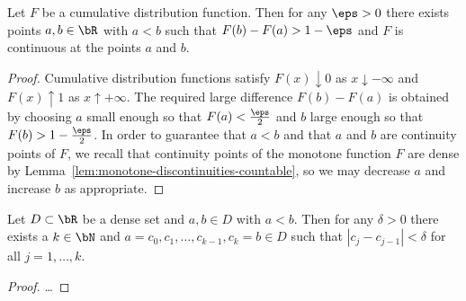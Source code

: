 \begin{lemma}
  \label{lem:cdf-tight}
  \leanok
  Let $F$ be a cumulative distribution function. Then for any
  $\eps > 0$ there exists points $a,b \in \bR$ with $a < b$ such that
  $F(b) - F(a) > 1 - \eps$ and $F$ is continuous at the points $a$ and $b$.
\end{lemma}
\begin{proof}
  Cumulative distribution functions satisfy
  $F(x) \downarrow 0$ as $x \downarrow - \infty$ and
  $F(x) \uparrow 1$ as $x \uparrow + \infty$. The
  required large difference $F(b) - F(a)$ is
  obtained by choosing $a$ small enough so that $F(a) < \frac{\eps}{2}$
  and $b$ large enough so that $F(b) > 1 - \frac{\eps}{2}$.
  In order to guarantee that $a < b$ and
  that $a$ and $b$ are continuity points of $F$, we
  recall that continuity points of the monotone function $F$ are dense
  by Lemma~\ref{lem:monotone-discontinuities-countable}, so we
  may decrease $a$ and increase $b$ as appropriate.
\end{proof}

\begin{lemma}
  \label{lem:subdivision-dense}
  \leanok
  Let $D \subset \bR$ be a dense set and $a,b \in D$ with $a < b$.
  Then for any $\delta > 0$ there exists a $k \in \bN$
  and $a = c_0, c_1, \ldots, c_{k-1}, c_k = b \in D$ such that
  $|c_j - c_{j-1}| < \delta$ for all $j=1,\ldots,k$.
\end{lemma}
\begin{proof}
  \ldots
\end{proof}

